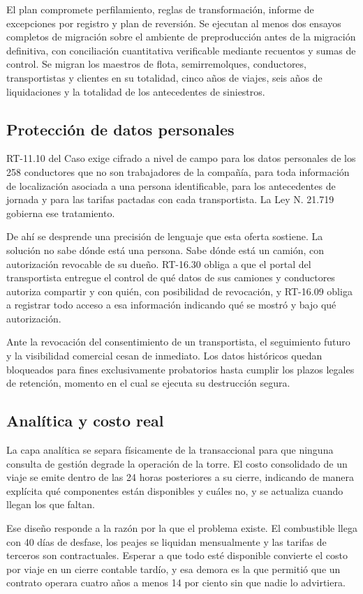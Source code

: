 El plan compromete perfilamiento, reglas de transformación, informe de excepciones por registro y
plan de reversión. Se ejecutan al menos dos ensayos completos de migración sobre el ambiente de
preproducción antes de la migración definitiva, con conciliación cuantitativa verificable mediante
recuentos y sumas de control. Se migran los maestros de flota, semirremolques, conductores,
transportistas y clientes en su totalidad, cinco años de viajes, seis años de liquidaciones y la
totalidad de los antecedentes de siniestros.

\subsection{Protección de datos personales}

RT-11.10 del Caso exige cifrado a nivel de campo para los datos personales de los 258 conductores
que no son trabajadores de la compañía, para toda información de localización asociada a una
persona identificable, para los antecedentes de jornada y para las tarifas pactadas con cada
transportista. La Ley N.\textordmasculine{} 21.719 \parencite{ley21719} gobierna ese tratamiento.

De ahí se desprende una precisión de lenguaje que esta oferta sostiene. La solución no sabe dónde
está una persona. Sabe dónde está un camión, con autorización revocable de su dueño. RT-16.30
obliga a que el portal del transportista entregue el control de qué datos de sus camiones y
conductores autoriza compartir y con quién, con posibilidad de revocación, y RT-16.09 obliga a
registrar todo acceso a esa información indicando qué se mostró y bajo qué autorización.

Ante la revocación del consentimiento de un transportista, el seguimiento futuro y la visibilidad
comercial cesan de inmediato. Los datos históricos quedan bloqueados para fines exclusivamente
probatorios hasta cumplir los plazos legales de retención, momento en el cual se ejecuta su
destrucción segura.

\subsection{Analítica y costo real}

La capa analítica se separa físicamente de la transaccional para que ninguna consulta de gestión
degrade la operación de la torre. El costo consolidado de un viaje se emite dentro de las 24 horas
posteriores a su cierre, indicando de manera explícita qué componentes están disponibles y cuáles
no, y se actualiza cuando llegan los que faltan.


Ese diseño responde a la razón por la que el problema existe. El combustible llega con 40 días de
desfase, los peajes se liquidan mensualmente y las tarifas de terceros son contractuales. Esperar a
que todo esté disponible convierte el costo por viaje en un cierre contable tardío, y esa demora es
la que permitió que un contrato operara cuatro años a menos 14 por ciento sin que nadie lo
advirtiera.
